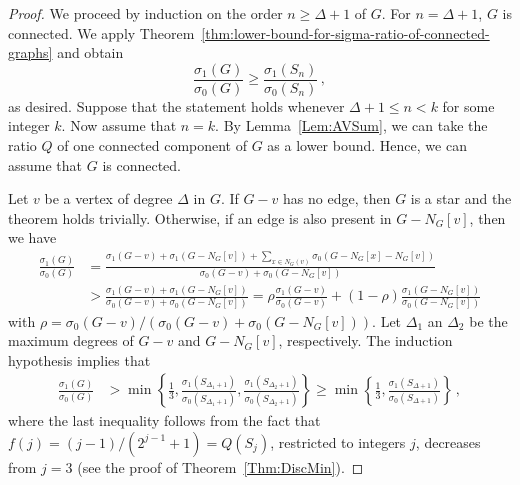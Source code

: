 \documentclass[a4paper,12pt]{amsart}
\begin{document}
\begin{proof}
We proceed by induction on the order $n\geq \Delta +1$ of $G$. For $n=\Delta+1$, $G$ is connected. We apply Theorem~\ref{thm:lower-bound-for-sigma-ratio-of-connected-graphs} and obtain
$$
\frac{\sigma_1(G)}{\sigma_0(G)}\geq \frac{\sigma_1(S_{n})}{\sigma_0(S_n)}\,,
$$
as desired. Suppose that the statement holds whenever $\Delta +1\leq n <k$ for some integer $k$. Now assume that $n=k$. By Lemma~\ref{Lem:AVSum}, we can take the ratio $Q$ of one connected component of $G$ as a lower bound. Hence, we can assume that $G$ is connected.

Let $v$ be a vertex of degree $\Delta$ in $G$. If $G-v$ has no edge, then $G$ is a star and the theorem holds trivially. Otherwise, if an edge is also present in $G-N_G[v]$, then we have
\begin{align*}
\frac{\sigma_1(G)}{\sigma_0(G)}
&=\frac{\sigma_1(G-v)+\sigma_1(G-N_G[v])+ \sum_{x\in N_G(v)}\sigma_0(G-N_G[x]-N_G[v])}{\sigma_0(G-v)+\sigma_0(G-N_G[v])}\\
&>\frac{\sigma_1(G-v)+\sigma_1(G-N_G[v])}{\sigma_0(G-v)+\sigma_0(G-N_G[v])}=\rho\frac{\sigma_1(G-v)}{\sigma_0(G-v)}+(1-\rho)\frac{\sigma_1(G-N_G[v])}{\sigma_0(G-N_G[v])}
\end{align*}
with $\rho= \sigma_0(G-v) / (\sigma_0(G-v)+\sigma_0(G-N_G[v]))$. Let $\Delta_1$ an $\Delta_2$ be the maximum degrees of $G-v$ and $G-N_G[v]$, respectively. The induction hypothesis implies that
\begin{align*}
\frac{\sigma_1(G)}{\sigma_0(G)}
& > \min\left\lbrace\frac{1}{3},\frac{\sigma_1(S_{\Delta_1 +1})}{\sigma_0(S_{\Delta_1 +1})}, \frac{\sigma_1(S_{\Delta_2 +1})}{\sigma_0(S_{\Delta_2 +1})}\right\rbrace\geq \min\left\lbrace\frac{1}{3},\frac{\sigma_1(S_{\Delta+1})}{\sigma_0(S_{\Delta+1})}\right\rbrace\,,
\end{align*}
where the last inequality follows from the fact that $f(j)=(j-1)/(2^{j-1}+1)=Q(S_{j})$, restricted to integers $j$, decreases from $j=3$ (see the proof of Theorem~\ref{Thm:DiscMin}).


\end{proof}
\end{document}
